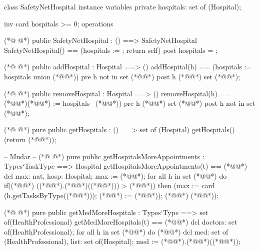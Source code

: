 \begin{vdmpp}[breaklines=true]
class SafetyNetHospital
instance variables
 private hospitals: set of (Hospital);
 
 inv card hospitals >= 0;
operations

(*@
\label{SafetyNetHospital:8}
@*)
 public SafetyNetHospital : () ==> SafetyNetHospital
  SafetyNetHospital() == (hospitals := {}; return self)
 post hospitals = {};
  
(*@
\label{addHospital:12}
@*)
 public addHospital : Hospital ==> ()
  addHospital(h) == (hospitals := hospitals union {(*@@*)})
 pre h not in set (*@@*)
 post h (*@@*) set (*@@*);
 
(*@
\label{removeHospital:17}
@*)
 public removeHospital : Hospital ==> ()
  removeHospital(h) == (*@\vdmnotcovered{(}@*)(*@@*) := hospitals \ {(*@@*)})
 pre h (*@@*) set (*@@*)
 post h not in set (*@@*);
 
(*@
\label{getHospitals:22}
@*)
 pure public getHospitals : () ==> set of (Hospital)
  getHospitals() == (return (*@@*));
 
 -- Mudar -- 
(*@
\label{getHospitalsMoreAppointments:26}
@*)
 pure public getHospitalsMoreAppointments : Types`TaskType ==> Hospital
  getHospitalsMoreAppointments(t) == (*@\vdmnotcovered{(}@*)
                    dcl max: nat, hosp: Hospital;
                    max := (*@@*);
                    for all h in set (*@@*) do
                     if((*@@*) ((*@@*).(*@@*)((*@@*))) > (*@@*))
                      then (max := card (h.getTasksByType((*@@*))); (*@@*) := (*@@*));
                    (*@@*) (*@@*));
 
(*@
\label{getMedMoreHospitals:35}
@*)
 pure public getMedMoreHospitals : Types`Type ==> set of(HealthProfessional)
  getMedMoreHospitals(t) == (*@\vdmnotcovered{(}@*)
                  dcl doctors: set of(HealthProfessional);
                  for all h in set (*@@*) do (*@\vdmnotcovered{(}@*)
                   dcl med: set of (HealthProfessional), list: set of(Hospital);
                   med := (*@@*).(*@@*)((*@@*));
                   

\end{vdmpp}
